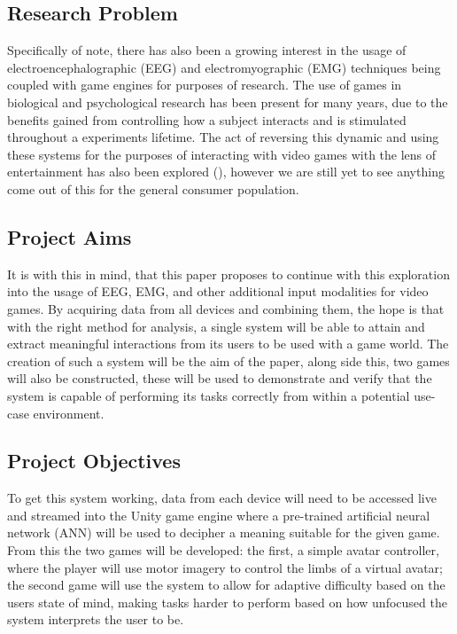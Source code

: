 \documentclass[11pt, a4paper]{article}
\newcommand{\citethis}[1]{(\cite{#1})}
\begin{document}
\subsection{Research Problem}
Specifically of note, there has also been a growing interest in the usage of electroencephalographic (EEG) and electromyographic (EMG) techniques being coupled with game engines for purposes of research. The use of games in biological and psychological research has been present for many years, due to the benefits gained from controlling how a subject interacts and is stimulated throughout a experiments lifetime. The act of reversing this dynamic and using these systems for the purposes of interacting with video games with the lens of entertainment has also been explored \citethis{6518141}, however we are still yet to see anything come out of this for the general consumer population. 

\subsection{Project Aims}
It is with this in mind, that this paper proposes to continue with this exploration into the usage of EEG, EMG, and other additional input modalities for video games. By acquiring data from all devices and combining them, the hope is that with the right method for analysis, a single system will be able to attain and extract meaningful interactions from its users to be used with a game world. The creation of such a system will be the aim of the paper, along side this, two games will also be constructed, these will be used to demonstrate and verify that the system is capable of performing its tasks correctly from within a potential use-case environment.

\subsection{Project Objectives}
To get this system working, data from each device will need to be accessed live and streamed into the Unity game engine where a pre-trained artificial neural network (ANN) will be used to decipher a meaning suitable for the given game. From this the two games will be developed: the first, a simple avatar controller, where the player will use motor imagery to control the limbs of a virtual avatar; the second game will use the system to allow for adaptive difficulty based on the users state of mind, making tasks harder to perform based on how unfocused the system interprets the user to be.
\end{document}
